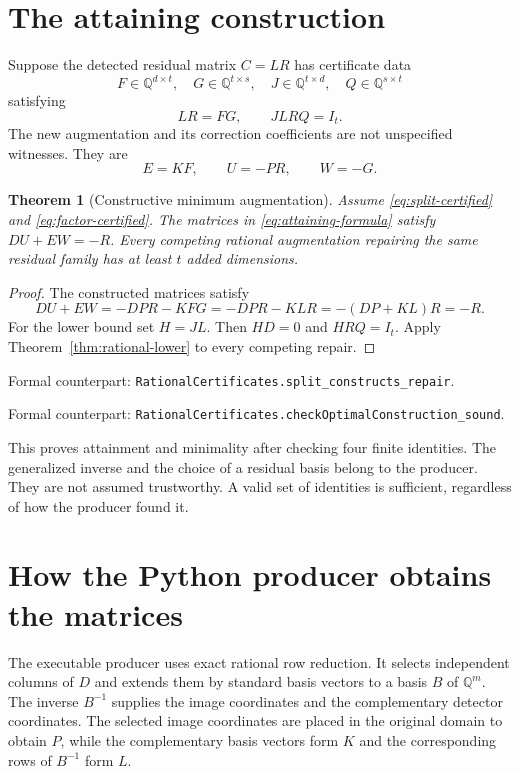 \documentclass[11pt,letterpaper,oneside,openany]{book}
\theoremstyle{quiet}
\newtheorem{theorem}{Theorem}[chapter]
\newcommand{\Q}{\mathbb{Q}}
\newcommand{\formal}[1]{\par\nobreak\begingroup\footnotesize\color{Slate}\sffamily Formal counterpart: \normalfont\nolinkurl{#1}.\par\endgroup}
\begin{document}
\section{The attaining construction}
Suppose the detected residual matrix $C=LR$ has certificate data
\[
 F\in\Q^{d\times t},\quad G\in\Q^{t\times s},\quad
 J\in\Q^{t\times d},\quad Q\in\Q^{s\times t}
\]
satisfying
\begin{equation}\label{eq:factor-certified}
 LR=FG,\qquad JLRQ=I_t.
\end{equation}
The new augmentation and its correction coefficients are not unspecified witnesses. They are
\begin{equation}\label{eq:attaining-formula}
 \boxed{E=KF,\qquad U=-PR,\qquad W=-G.}
\end{equation}

\begin{theorem}[Constructive minimum augmentation]\label{thm:matrix-attainment}
Assume \eqref{eq:split-certified} and \eqref{eq:factor-certified}. The matrices in \eqref{eq:attaining-formula} satisfy $DU+EW=-R$. Every competing rational augmentation repairing the same residual family has at least $t$ added dimensions.
\end{theorem}
\begin{proof}
The constructed matrices satisfy
\[
 DU+EW=-DPR-KFG=-DPR-KLR=-(DP+KL)R=-R.
\]
For the lower bound set $H=JL$. Then $HD=0$ and $HRQ=I_t$. Apply Theorem~\ref{thm:rational-lower} to every competing repair.
\end{proof}
\formal{RationalCertificates.split_constructs_repair}
\formal{RationalCertificates.checkOptimalConstruction_sound}

This proves attainment and minimality after checking four finite identities. The generalized inverse and the choice of a residual basis belong to the producer. They are not assumed trustworthy. A valid set of identities is sufficient, regardless of how the producer found it.

\section{How the Python producer obtains the matrices}
The executable producer uses exact rational row reduction. It selects independent columns of $D$ and extends them by standard basis vectors to a basis $B$ of $\Q^m$. The inverse $B^{-1}$ supplies the image coordinates and the complementary detector coordinates. The selected image coordinates are placed in the original domain to obtain $P$, while the complementary basis vectors form $K$ and the corresponding rows of $B^{-1}$ form $L$.
\end{document}
